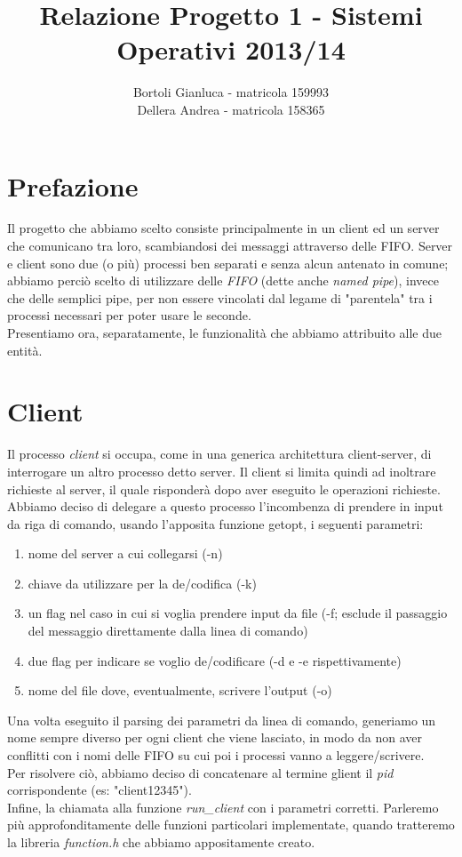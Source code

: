 \documentclass[a4paper,10pt]{article}
\begin{document}
\author{Bortoli Gianluca - matricola 159993\\Dellera Andrea - matricola 158365}
\title{Relazione Progetto 1 - Sistemi Operativi 2013/14}
\maketitle
\pagebreak

\section{Prefazione}
Il progetto che abbiamo scelto consiste principalmente in un client ed un server che comunicano tra loro, scambiandosi dei messaggi attraverso delle FIFO. Server e client sono due (o più) processi ben separati e senza alcun antenato in comune; abbiamo perciò scelto di utilizzare delle \emph{FIFO} (dette anche \emph{named pipe}), invece che delle semplici pipe, per non essere vincolati dal legame di "parentela" tra i processi necessari per poter usare le seconde.\\
Presentiamo ora, separatamente, le funzionalità che abbiamo attribuito alle due entità.

\section{Client}
Il processo \emph{client} si occupa, come in una generica architettura client-server, di interrogare un altro processo detto server. Il client si limita quindi ad inoltrare richieste al server, il quale risponderà dopo aver eseguito le operazioni richieste.\\
Abbiamo deciso di delegare a questo processo l'incombenza di prendere in input da riga di comando, usando l'apposita funzione getopt, i seguenti parametri:
\begin{enumerate}
\item nome del server a cui collegarsi (-n)
\item chiave da utilizzare per la de/codifica (-k)
\item un flag nel caso in cui si voglia prendere input da file (-f; esclude il passaggio del messaggio direttamente dalla linea di comando)
\item due flag per indicare se voglio de/codificare (-d e -e rispettivamente)
\item nome del file dove, eventualmente, scrivere l'output (-o)
\end{enumerate}
Una volta eseguito il parsing dei parametri da linea di comando, generiamo un nome sempre diverso per ogni client che viene lasciato, in modo da non aver conflitti con i nomi delle FIFO su cui poi i processi vanno a leggere/scrivere.\\
Per risolvere ciò, abbiamo deciso di concatenare al termine glient il \emph{pid} corrispondente (es: "client12345").\\
Infine, la chiamata alla funzione \emph{run\_client} con i parametri corretti. Parleremo più approfonditamente delle funzioni particolari implementate, quando tratteremo la libreria \emph{function.h} che abbiamo appositamente creato.
\end{document}
